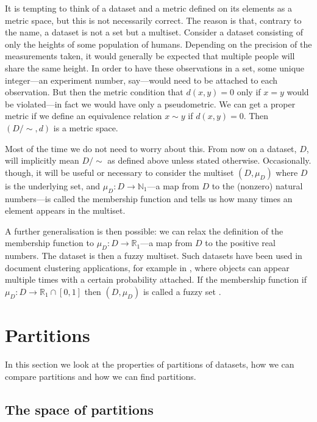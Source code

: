 \documentclass[a4paper]{report}
\newcommand{\dset}{D}
\begin{document}
It is tempting to think of a dataset and a metric defined on its elements as a
metric space, but this is not necessarily correct.  The reason is that,
contrary to the name, a dataset is not a set but a multiset.  Consider a
dataset consisting of only the heights of some population of humans.
Depending on the precision of the measurements taken, it would generally be
expected that multiple people will share the same height.  In order to have
these observations in a set, some unique integer---an experiment number,
say---would need to be attached to each observation.  But then the metric
condition that $d(x,y)=0$ only if $x=y$ would be violated---in fact we would
have only a pseudometric.  We can get a proper metric if we define an
equivalence relation $x \sim y$ if $d(x,y)=0$.  Then $(\dset/\sim,d)$ is a
metric space.

Most of the time we do not need to worry about this.  From now on a dataset,
$\dset$, will implicitly mean $\dset/\sim$ as defined above unless stated
otherwise.  Occasionally. though, it will be useful or necessary to consider
the multiset $(\dset,\mu_{\dset})$ where $\dset$ is the underlying set, and
$\mu_{\dset} \colon \dset \to \mathbb{N}_1$---a map from $\dset$ to the
(nonzero) natural numbers---is called the membership function and tells us how
many times an element appears in the multiset.

A further generalisation is then possible: we can relax the definition of the
membership function to $\mu_{\dset} \colon \dset \to \mathbb{R}_1$---a map
from $\dset$ to the positive real numbers.  The dataset is then a fuzzy
multiset.  Such datasets have been used in document clustering applications,
for example in \citep{miyamoto2003information}, where objects can appear
multiple times with a certain probability attached.  If the membership
function if $\mu_{\dset} \colon \dset \to \mathbb{R}_1 \cap [0,1]$ then
$(\dset,\mu_{\dset})$ is called a fuzzy set
\citep{zadeh1965fuzzy,gottwald2010fuzzy}.

\section{Partitions}
\label{sec:partitions}

In this section we look at the properties of partitions of datasets, how we
can compare partitions and how we can find partitions.

\subsection{The space of partitions}
\label{sec:space-partitions}
\end{document}

